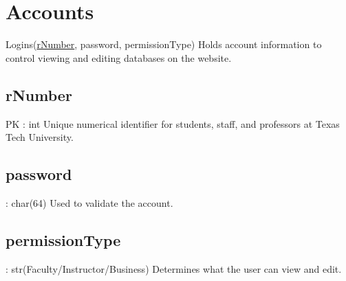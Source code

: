 \section{Accounts}
	Logins(\underline{rNumber}, password, permissionType) 
		Holds account information to control viewing and editing databases on the website.
	
	\subsection{rNumber}
		PK : int 
		Unique numerical identifier for students, staff, and professors at Texas Tech University.
    
    \subsection{password}
    	: char(64)
    	Used to validate the account.
    
    \subsection{permissionType}
	    : str(Faculty/Instructor/Business) 
		Determines what the user can view and edit.